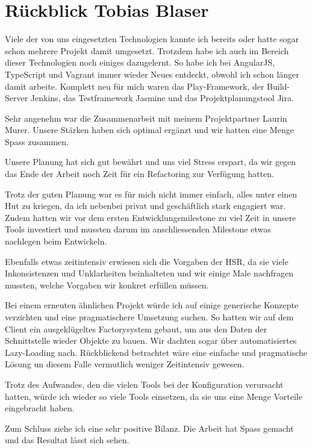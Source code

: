 	\section*{Rückblick Tobias Blaser}
		
		
		Viele der von uns eingesetzten Technologien kannte ich bereits oder hatte sogar schon mehrere Projekt damit umgesetzt.
		Trotzdem habe ich auch im Bereich dieser Technologien noch einiges dazugelernt.
		So habe ich bei AngularJS, TypeScript und Vagrant immer wieder Neues entdeckt, obwohl ich schon länger damit arbeite.
		Komplett neu für mich waren das Play-Framework, der Build-Server Jenkins, das Testframework Jasmine und das Projektplanungstool Jira.
		
		
		Sehr angenehm war die Zusammenarbeit mit meinem Projektpartner Laurin Murer. Unsere Stärken haben sich optimal ergänzt und wir hatten eine Menge Spass zusammen.
		
		Unsere Planung hat sich gut bewährt und uns viel Stress erspart, da wir gegen das Ende der Arbeit noch Zeit für ein Refactoring zur Verfügung hatten.
		
		
		Trotz der guten Planung war es für mich nicht immer einfach, alles unter einen Hut zu kriegen, da ich nebenbei privat und geschäftlich stark engagiert war.
		Zudem hatten wir vor dem ersten Entwicklungsmilestone zu viel Zeit in unsere Tools investiert und mussten darum im anschliessenden Milestone etwas nachlegen beim Entwickeln.
		
		Ebenfalls etwas zeitintensiv erwiesen sich die Vorgaben der HSR, da sie viele Inkonsistenzen und Unklarheiten beinhalteten und wir einige Male nachfragen mussten, welche Vorgaben wir konkret erfüllen müssen.
		
		
		Bei einem erneuten ähnlichen Projekt würde ich auf einige generische Konzepte verzichten und eine pragmatischere Umsetzung suchen. So hatten wir auf dem Client ein ausgeklügeltes Factorysystem gebaut, um aus den Daten der Schnittstelle wieder Objekte zu bauen.
		Wir dachten sogar über automatisiertes Lazy-Loading nach. 
		Rückblickend betrachtet wäre eine einfache und pragmatische Lösung un diesem Falle vermutlich weniger Zeitintensiv gewesen.
		

		Trotz des Aufwandes, den die vielen Tools bei der Konfiguration verursacht hatten, würde ich wieder so viele Tools einsetzen, da sie uns eine Menge Vorteile eingebracht haben.
				
		
		Zum Schluss ziehe ich eine sehr positive Bilanz.
		Die Arbeit hat Spass gemacht und das Resultat lässt sich sehen.